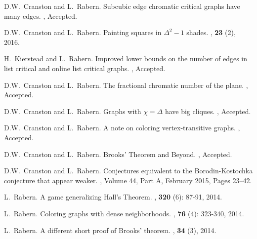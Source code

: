 \documentclass[10pt]{article}
\begin{document}
\begin{enumerate}[{[}1{]}]
\item
D.W.~Cranston and L.~Rabern.
\newblock Subcubic edge chromatic critical graphs have many edges.
, Accepted.
\smallskip

\item
D.W.~Cranston and L.~Rabern.
\newblock Painting squares in $\Delta^2 - 1$ shades.
, \textbf{23} (2), 2016.
	
	\smallskip
	
	\item
H.~Kierstead and L.~Rabern.
\newblock Improved lower bounds on the number of edges in list critical and online list critical graphs.
, Accepted.

\item D.W.~Cranston and L.~Rabern.
	\newblock The fractional chromatic number of the plane.
	, Accepted.
	
\item D.W.~Cranston and L.~Rabern.
\newblock Graphs with $\chi = \Delta$ have big cliques.
, Accepted.	

\item D.W.~Cranston and L.~Rabern.
\newblock A note on coloring vertex-transitive graphs.
, Accepted.

\item
	D.W.~Cranston and L.~Rabern.
	\newblock Brooks' Theorem and Beyond.
	, Accepted.
	
\item D.W.~Cranston and L.~Rabern.
\newblock Conjectures equivalent to the Borodin-Kostochka conjecture that appear weaker.
, Volume 44, Part A, February 2015, Pages 23–42.

\item L.~Rabern.
\newblock A game generalizing Hall's Theorem.
, \textbf{320} (6): 87-91, 2014.

\item L.~Rabern.
\newblock Coloring graphs with dense neighborhoods.
, \textbf{76} (4): 323-340, 2014.

\item L.~Rabern.
\newblock A different short proof of Brooks' theorem.
, \textbf{34} (3), 2014.


\end{enumerate}
\end{document}

